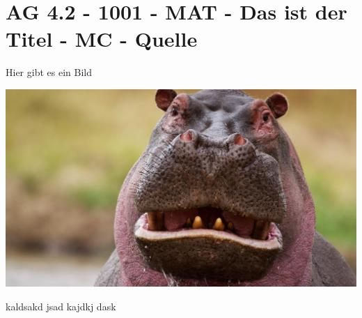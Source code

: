 \section{AG 4.2 - 1001 - MAT - Das ist der Titel - MC - Quelle}

\begin{beispiel}[AG 4.2]{1}
Hier gibt es ein Bild

\includegraphics{../_database_inoffiziell/Bilder/AG42_1001_hippo.eps}

kaldsakd jsad kajdkj dask
\end{beispiel}